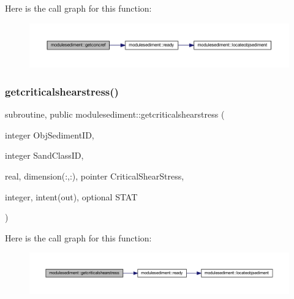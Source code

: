 Here is the call graph for this function\+:\nopagebreak
\begin{figure}[H]
\begin{center}
\leavevmode
\includegraphics[width=350pt]{namespacemodulesediment_a1ace217828c80197497b60fcaad2f95b_cgraph}
\end{center}
\end{figure}
\mbox{\label{namespacemodulesediment_a8d9dd5db543a7e0c9baac18bef6dffcf}} 
\subsubsection{\texorpdfstring{getcriticalshearstress()}{getcriticalshearstress()}}
{\footnotesize\ttfamily subroutine, public modulesediment\+::getcriticalshearstress (\begin{DoxyParamCaption}\item[{integer}]{Obj\+Sediment\+ID,  }\item[{integer}]{Sand\+Class\+ID,  }\item[{real, dimension(\+:,\+:), pointer}]{Critical\+Shear\+Stress,  }\item[{integer, intent(out), optional}]{S\+T\+AT }\end{DoxyParamCaption})}

Here is the call graph for this function\+:\nopagebreak
\begin{figure}[H]
\begin{center}
\leavevmode
\includegraphics[width=350pt]{namespacemodulesediment_a8d9dd5db543a7e0c9baac18bef6dffcf_cgraph}
\end{center}
\end{figure}
\mbox{\label{namespacemodulesediment_aa0d71895956b87280c4aa42094f08fdd}} 
